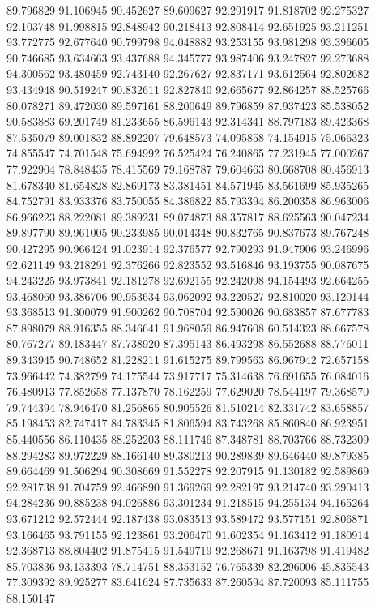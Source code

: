 89.796829
91.106945
90.452627
89.609627
92.291917
91.818702
92.275327
92.103748
91.998815
92.848942
90.218413
92.808414
92.651925
93.211251
93.772775
92.677640
90.799798
94.048882
93.253155
93.981298
93.396605
90.746685
93.634663
93.437688
94.345777
93.987406
93.247827
92.273688
94.300562
93.480459
92.743140
92.267627
92.837171
93.612564
92.802682
93.434948
90.519247
90.832611
92.827840
92.665677
92.864257
88.525766
80.078271
89.472030
89.597161
88.200649
89.796859
87.937423
85.538052
90.583883
69.201749
81.233655
86.596143
92.314341
88.797183
89.423368
87.535079
89.001832
88.892207
79.648573
74.095858
74.154915
75.066323
74.855547
74.701548
75.694992
76.525424
76.240865
77.231945
77.000267
77.922904
78.848435
78.415569
79.168787
79.604663
80.668708
80.456913
81.678340
81.654828
82.869173
83.381451
84.571945
83.561699
85.935265
84.752791
83.933376
83.750055
84.386822
85.793394
86.200358
86.963006
86.966223
88.222081
89.389231
89.074873
88.357817
88.625563
90.047234
89.897790
89.961005
90.233985
90.014348
90.832765
90.837673
89.767248
90.427295
90.966424
91.023914
92.376577
92.790293
91.947906
93.246996
92.621149
93.218291
92.376266
92.823552
93.516846
93.193755
90.087675
94.243225
93.973841
92.181278
92.692155
92.242098
94.154493
92.664255
93.468060
93.386706
90.953634
93.062092
93.220527
92.810020
93.120144
93.368513
91.300079
91.900262
90.708704
92.590026
90.683857
87.677783
87.898079
88.916355
88.346641
91.968059
86.947608
60.514323
88.667578
80.767277
89.183447
87.738920
87.395143
86.493298
86.552688
88.776011
89.343945
90.748652
81.228211
91.615275
89.799563
86.967942
72.657158
73.966442
74.382799
74.175544
73.917717
75.314638
76.691655
76.084016
76.480913
77.852658
77.137870
78.162259
77.629020
78.544197
79.368570
79.744394
78.946470
81.256865
80.905526
81.510214
82.331742
83.658857
85.198453
82.747417
84.783345
81.806594
83.743268
85.860840
86.923951
85.440556
86.110435
88.252203
88.111746
87.348781
88.703766
88.732309
88.294283
89.972229
88.166140
89.380213
90.289839
89.646440
89.879385
89.664469
91.506294
90.308669
91.552278
92.207915
91.130182
92.589869
92.281738
91.704759
92.466890
91.369269
92.282197
93.214740
93.290413
94.284236
90.885238
94.026886
93.301234
91.218515
94.255134
94.165264
93.671212
92.572444
92.187438
93.083513
93.589472
93.577151
92.806871
93.166465
93.791155
92.123861
93.206470
91.602354
91.163412
91.180914
92.368713
88.804402
91.875415
91.549719
92.268671
91.163798
91.419482
85.703836
93.133393
78.714751
88.353152
76.765339
82.296006
45.835543
77.309392
89.925277
83.641624
87.735633
87.260594
87.720093
85.111755
88.150147
